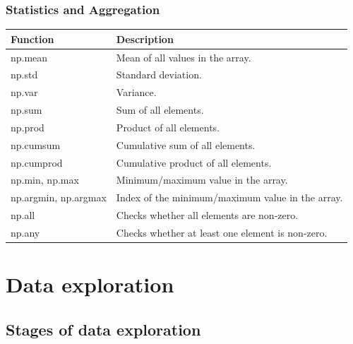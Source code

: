 \documentclass[
  english,
  letterpaper,
  DIV=11,
  numbers=noendperiod]{scrreprt}
\newcounter{none} %
\begin{document}
\section{Statistics and Aggregation}\label{statistics-and-aggregation}

{\def\LTcaptype{none} %
\begin{longtable}[]{@{}
  >{\raggedright\arraybackslash}p{}
  >{\raggedright\arraybackslash}p{}@{}}
\toprule\noalign{}
\begin{minipage}[b]{\linewidth}\raggedright
Function
\end{minipage} & \begin{minipage}[b]{\linewidth}\raggedright
Description
\end{minipage} \\
\midrule\noalign{}
\endhead
\bottomrule\noalign{}
\endlastfoot
np.mean & Mean of all values in the array. \\
np.std & Standard deviation. \\
np.var & Variance. \\
np.sum & Sum of all elements. \\
np.prod & Product of all elements. \\
np.cumsum & Cumulative sum of all elements. \\
np.cumprod & Cumulative product of all elements. \\
np.min, np.max & Minimum/maximum value in the array. \\
np.argmin, np.argmax & Index of the minimum/maximum value in the
array. \\
np.all & Checks whether all elements are non-zero. \\
np.any & Checks whether at least one element is non-zero. \\
\end{longtable}
}

\part{Data exploration}

\chapter{Stages of data exploration}\label{stages-of-data-exploration}
\end{document}
